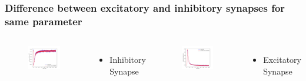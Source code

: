 \documentclass{beamer}
\begin{document}
\begin{frame}

	\frametitle{Difference between excitatory and inhibitory synapses for same parameter}
	 \begin{columns}
          	\begin{figure}
    				\centering
    				\includegraphics[width=\linewidth]{figures/epsp_inh_fall_03_out_05.pdf}
 		   \end{figure}
 		   \begin{itemize}
          		\item Inhibitory Synapse
          	\end{itemize}

          \begin{figure}
    				\centering
    				\includegraphics[width=\linewidth]{figures/epsp_exc_fall_03_out_05.pdf}
 		   \end{figure}
 		   \begin{itemize}
          		\item Excitatory Synapse
          	\end{itemize}
          	

\end{columns}
\end{frame}
\end{document}
